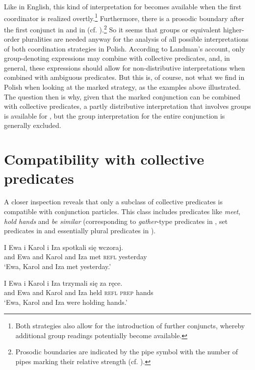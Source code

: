 \documentclass[output=paper]{langscibook}
\begin{document}
\noindent Like in English, this kind of interpretation for  becomes available when the first coordinator is realized overtly.\footnote{Both strategies also allow for the introduction of further conjuncts, whereby additional group readings potentially become available.} Furthermore, there is a prosodic boundary after the first conjunct in  and in  (cf. \citealt{Winter:2002, Wagner:2010}).\footnote{Prosodic boundaries are indicated by the pipe symbol with the number of pipes marking their relative strength (cf. \citealt{Wagner:2010}).} So it seems that groups or equivalent higher-order pluralities are needed anyway for the analysis of all possible interpretations of both coordination strategies in Polish. According to Landman's account, only group-denoting expressions may combine with collective predicates, and, in general, these expressions should allow for non-distributive interpretations when combined with ambiguous predicates. But this is, of course, not what we find in Polish when looking at the marked strategy, as the examples above illustrated. The question then is why, given that the marked conjunction can be combined with collective predicates, a partly distributive interpretation that involves groups is available for , but the group interpretation for the entire conjunction is generally excluded.  



\section{Compatibility with collective predicates}\label{ros:sec:3}

A closer inspection reveals that only a subclass of collective predicates is compatible with conjunction particles. This class includes predicates like \textit{meet}, \textit{hold hands} and \textit{be similar} (corresponding to \textit{gather}-type predicates in \citealt{Champollion:2010}, set predicates in \citealt{Winter:2002} and essentially plural predicates in \citealt{Hackl:2002}). 

\ea\label{ros:meet} \gll  I Ewa i Karol i Iza spotkali się wczoraj. \\
and Ewa and Karol and Iza  met \textsc{refl} yesterday \\
\glt `Ewa, Karol and Iza met yesterday.' 
\z

\ea\label{ros:hand} \gll I Ewa i Karol i Iza trzymali się za ręce. \\
and Ewa and Karol and Iza held \textsc{refl} \textsc{prep} hands \\
\glt `Ewa, Karol and Iza were holding hands.' 
\z
\end{document}
